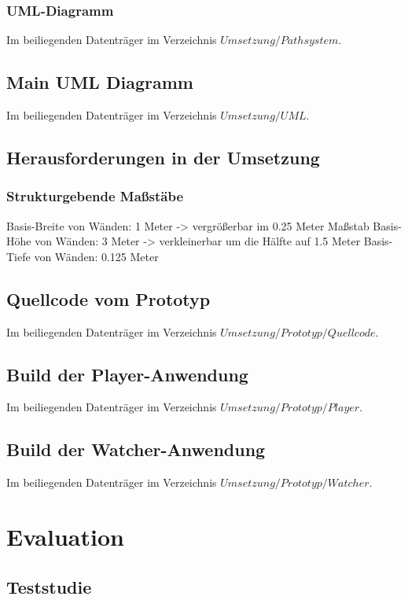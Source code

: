 \documentclass[
	12pt,
	a4paper,
	bibtotoc,
	cleardoubleempty, 
	idxtotoc,
	ngerman,
	openright
	final,
	listof=nochaptergap,
	]{scrbook}
\begin{document}
\begin{appendices}
\subsubsection{UML-Diagramm}\label{sec:append_realisation_uml_path}
Im beiliegenden Datenträger im Verzeichnis $Umsetzung/Pathsystem$. 


\subsection{Main UML Diagramm}
Im beiliegenden Datenträger im Verzeichnis $Umsetzung/UML$. 

\subsection{Herausforderungen in der Umsetzung}

\subsubsection{Strukturgebende Maßstäbe}\label{sec:append_realisation_maßstaebe}
Basis-Breite von Wänden: 1 Meter -> vergrößerbar im 0.25 Meter Maßstab
Basis-Höhe von Wänden: 3 Meter -> verkleinerbar um die Hälfte auf 1.5 Meter
Basis-Tiefe von Wänden: 0.125 Meter


\subsection{Quellcode vom Prototyp}
Im beiliegenden Datenträger im Verzeichnis $Umsetzung/Prototyp/Quellcode$. 

\subsection{Build der Player-Anwendung}
Im beiliegenden Datenträger im Verzeichnis $Umsetzung/Prototyp/Player$. 

\subsection{Build der Watcher-Anwendung}
Im beiliegenden Datenträger im Verzeichnis $Umsetzung/Prototyp/Watcher$. 

\section{Evaluation}

\subsection{Teststudie}


\end{appendices}
\end{document}
